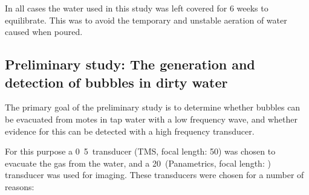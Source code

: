 In all cases the water used in this study was left covered for 6 weeks to equilibrate.
This was to avoid the temporary and unstable aeration of water caused when poured.


\subsection{Preliminary study: The generation and detection of bubbles in dirty water}\label{sec:exp:prelim}

The primary goal of the preliminary study is  to determine whether bubbles can be evacuated from motes in tap 
water with a low frequency wave, 
and whether evidence for this can be detected with a high frequency transducer.

For this purpose a \unit{0.5}\mega\hertz\ transducer (TMS, focal length: \unit{50}\milli\metre) was chosen to evacuate the gas from the water,
and a \unit{20}\mega\hertz\ (Panametrics, focal length: \CortexFL)  transducer was used for imaging.
These transducers were chosen for a number of reasons:
